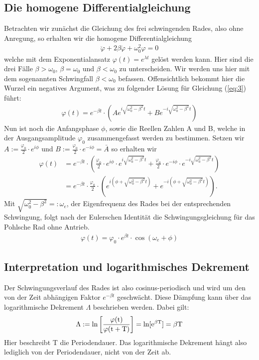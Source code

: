 \subsection{Die homogene Differentialgleichung}
\label{h.DGL}
Betrachten wir zunächst die Gleichung des frei schwingenden Rades, also ohne Anregung, so erhalten wir die homogene Differentialgleichung
\begin{align}
\label{eq:3}
\ddot{\varphi}+2\beta\dot{\varphi}+\omega_0^2\varphi=0
\end{align}
welche mit dem Exponentialansatz $\varphi(t)=e^{\lambda t}$ gelöst werden kann. Hier sind die drei Fälle $\beta>\omega_0$, $\beta=\omega_0$ und $\beta<\omega_0$ zu unterscheiden. 
Wir werden uns hier mit dem sogenannten Schwingfall $\beta<\omega_0$ befassen. 
Offensichtlich bekommt hier die Wurzel ein negatives Argument, was zu folgender Lösung für
Gleichung (\ref{eq:3}) führt:
\begin{align}
\label{eq:4}
\varphi(t)=e^{-\beta t}\cdot\left(Ae^{i\sqrt{\omega_0^2-\beta^2}t} + Be^{-i\sqrt{\omega_0^2-\beta^2}t}\right)
\end{align}
Nun ist noch die Anfangsphase $\phi$, sowie die Reellen Zahlen A und B, welche 
in der Ausgangsamplitude $\varphi_0$ zusammengefasst werden zu bestimmen. Setzen wir $A:=\frac{\varphi_0}{2}\cdot e^{i\phi}$ und 
$B:=\frac{\varphi_0}{2}\cdot e^{-i\phi}=\bar{A}$ so erhalten wir \begin{align}
\label{eq:5}
\varphi(t) &= e^{-\beta t}\cdot\left(\frac{\varphi_0}{2}\cdot e^{i\phi}\cdot e^{i\sqrt{\omega_0^2-\beta^2}t} + 
\frac{\varphi_0}{2}\cdot e^{-i\phi}\cdot e^{-i\sqrt{\omega_0^2-\beta^2}t}\right)\nonumber \\
&= e^{-\beta t}\cdot\frac{\varphi_0}{2}\cdot\left(e^{i(\phi+\sqrt{\omega_0^2-\beta^2}t)}+e^{-i(\phi+\sqrt{\omega_0^2-\beta^2}t)}\right).
\end{align}
Mit $\sqrt{\omega_0^2-\beta^2}=:\omega_e$, der Eigenfrequenz des Rades bei der entsprechenden Schwingung, folgt nach der 
\glqq Eulerschen Identität \grqq{} die Schwingungsgleichung für das Pohlsche Rad ohne Antrieb.
\begin{align}
\label{eq:6}
\varphi(t)=\varphi_0\cdot e^{\beta t}\cdot\cos(\omega_e + \phi)
\end{align}

\subsection{Interpretation und logarithmisches Dekrement}
\label{log.Dek}
Der Schwingungsverlauf des Rades ist also cosinus-periodisch und wird um den von der Zeit abhängigen Faktor $e^{-\beta t}$ geschwächt. 
Diese  Dämpfung kann über das logarithmische Dekrement $\Lambda$ beschrieben werden. Dabei gilt:
\begin{align}
\label{eq:7}
\Lambda := \rm {ln}\left[{\frac{\varphi(t)}{\varphi(t+T)}}\right]={\rm {ln}}[e^{\beta T}]=\beta T
\end{align}
Hier beschreibt T die Periodendauer. Das logarithmische Dekrement hängt also lediglich von der Periodendauer, nicht 
von der Zeit ab.

